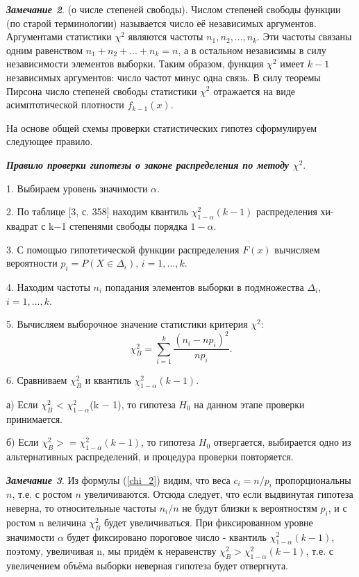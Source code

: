 \textbf{\textit{Замечание 2}}. (о числе степеней свободы).
Числом степеней свободы функции (по старой терминологии) называется число её независимых аргументов. Аргументами статистики $\chi^{2}$ являются частоты $n_{1},n_{2}, ... ,n_{k}$. Эти частоты связаны одним равенством $n_{1} + n_{2} + ... + n_{k}  = n$, а в остальном независимы в силу независимости элементов выборки. Таким образом, функция $\chi^{2}$  имеет $k-1$ независимых аргументов: число частот минус одна связь. В силу теоремы Пирсона число степеней свободы статистики $\chi^{2}$  отражается на виде асимптотической плотности $f_{k - 1}(x)$.

На основе общей схемы проверки статистических гипотез сформулируем следующее правило.

\textbf{\textit{Правило проверки гипотезы о законе распределения по методу $\chi^{2}$}}.

1. Выбираем уровень значимости $\alpha$.

2. По таблице [3, с. 358] находим квантиль $\chi^{2}_{1-\alpha}(k - 1)$ распределения хи-квадрат с k$-$1 степенями свободы порядка $1-\alpha$. 

3. С помощью гипотетической функции распределения $F(x)$ вычисляем вероятности $p_{i} = P (X \in \Delta_{i})$, $i = 1, ... ,k$.

4. Находим частоты $n_{i}$ попадания элементов выборки в подмножества $\Delta_{i}$, $i = 1, ... ,k$. 

5. Вычисляем выборочное значение статистики критерия $\chi^{2}$:
\begin{equation}
	\chi^{2}_{B} =\sum_{i = 1}^{k}{\frac{(n_{i} - np_{i})^{2}}{np_{i}}}.
	\label{chi_B}
\end{equation}

6. Сравниваем $\chi^{2}_{B}$ и квантиль $\chi^{2}_{1-\alpha}(k-1)$.

а) Если $\chi^{2}_{B}$ < $\chi^{2}_{1-\alpha}$(k $-$ 1), то гипотеза $H_{0}$ на данном этапе проверки принимается. 

б) Если $\chi^{2}_{B} >= \chi^{2}_{1-\alpha}(k -1)$, то гипотеза $H_{0}$ отвергается, выбирается одно из альтернативных распределений, и процедура проверки повторяется.

\textbf{\textit{Замечание 3}}. Из формулы (\ref{chi_2}) видим, что веса $c_i = n/p_{i}$ пропорциональны $n$, т.е. с ростом $n$ увеличиваются. Отсюда следует, что если выдвинутая гипотеза неверна, то относительные частоты $n_{i}/n$ не будут близки к вероятностям $p_{i}$, и с ростом n величина  $\chi^{2}_{B}$  будет увеличиваться. При фиксированном уровне значимости $\alpha$ будет фиксировано пороговое число - квантиль $\chi^{2}_{1-\alpha}(k-1)$, поэтому, увеличивая n, мы придём к неравенству $\chi^{2}_{B} > \chi^{2}_{1-\alpha}(k-1)$, т.е. с увеличением объёма выборки неверная гипотеза будет отвергнута.

